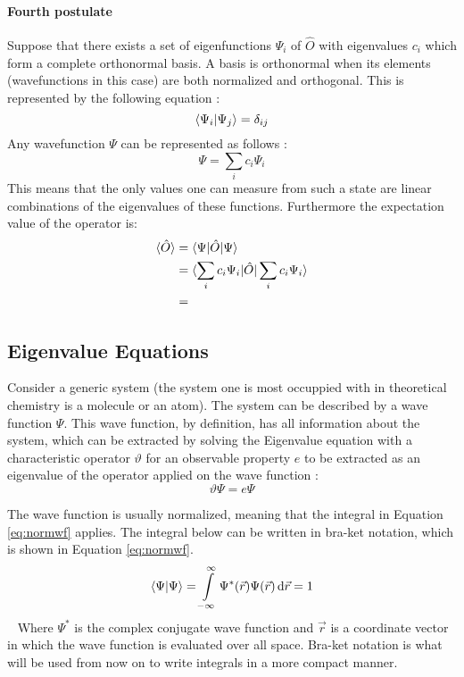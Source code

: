 \documentclass[../master_thesis.tex]{subfiles}
\begin{document}
\paragraph{Fourth postulate}
Suppose that there exists a set of eigenfunctions $\Psi_i$ of $\hat{O}$ with
eigenvalues $c_i$ which form a complete orthonormal basis. A basis is
orthonormal when its elements (wavefunctions in this case) are both normalized
and orthogonal. This is represented by the following equation
\cite{Jensen:2017, Cramer:2004, Cohen:1973}:
\begin{equation}
  \braket{\Psi_i|\Psi_j} = \delta_{ij}
\end{equation}
 Any wavefunction $\Psi$ can be
represented as follows \cite{Cohen:1973}:
\begin{equation}
  \Psi = \sum_i c_i\Psi_i
\end{equation}
This means that the only values one can measure from such a state are linear
combinations of the eigenvalues of these functions. Furthermore the expectation
value of the operator is:
\begin{align}
  \begin{split}
    \braket{\hat{O}} &= \braket{\Psi|\hat{O}|\Psi} \\
                     &= \braket{\sum_i c_i \Psi_i|\hat{O}|\sum_i c_i \Psi_i} \\
                     &=
  \end{split}
\end{align}
\subsection{Eigenvalue Equations}
Consider a generic system (the system one is most occuppied with in theoretical
chemistry is a molecule or an atom). The system can be described by a
wave function $\Psi$. This wave function, by definition, has all information
about the system, which can be extracted by solving the Eigenvalue equation
with a characteristic operator $\vartheta$ for an observable property $ e $ to
be extracted as an eigenvalue of the operator applied on the wave function
\cite{Cramer:2004}:
\begin{equation}
  \vartheta\Psi = e\Psi\label{eq:eigenequation}
\end{equation}

The wave function is usually normalized, meaning that the integral in Equation
\ref{eq:normwf} applies. The integral below can be written in bra-ket
\cite{Jensen:2017} notation, which is shown in Equation \ref{eq:normwf}.
\begin{equation}
  \braket{\Psi|\Psi} = \int\limits_{-\infty}^{\infty}
  \Psi^*(\vec{r})\Psi(\vec{r})\mathrm{\,d}\vec{r} = 1\label{eq:normwf}
\end{equation} 
Where $\Psi^*$ is the complex conjugate wave function and $\vec{r}$ is a
coordinate vector in which the wave function is evaluated over all space.
Bra-ket notation is what will be used from now on to write integrals in a more
compact manner.
\end{document}
